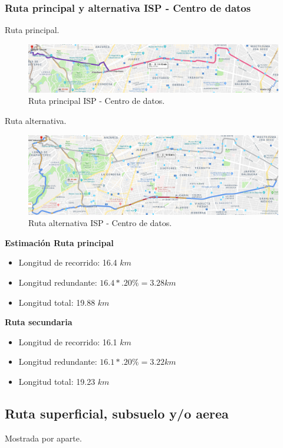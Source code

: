 \documentclass[12pt,letterpaper]{article}
\begin{document}
\subsubsection{Ruta principal y alternativa ISP - Centro de datos}
Ruta principal.
\begin{figure}[ht]
    \centering
    \includegraphics[width=1\textwidth]{imagenes/f22.png}
    \caption{Ruta principal ISP - Centro de datos.}
\end{figure}

\newpage
Ruta alternativa.
\begin{figure}[ht]
    \centering
    \includegraphics[width=1\textwidth]{imagenes/f23.png}
    \caption{Ruta alternativa ISP - Centro de datos.}
\end{figure}

\textbf{Estimación Ruta principal}
\begin{itemize}
    \item Longitud de recorrido: 16.4 $km$
    \item Longitud redundante: $16.4*.20\%=3.28km$
    \item Longitud total: 19.88 $km$
\end{itemize}

\textbf{Ruta secundaria}
\begin{itemize}
    \item Longitud de recorrido: 16.1 $km$
    \item Longitud redundante: $16.1*.20\%=3.22km$
    \item Longitud total: 19.23 $km$ 
\end{itemize}

\subsection{Ruta superficial, subsuelo y/o aerea}
Mostrada por aparte.
\end{document}
